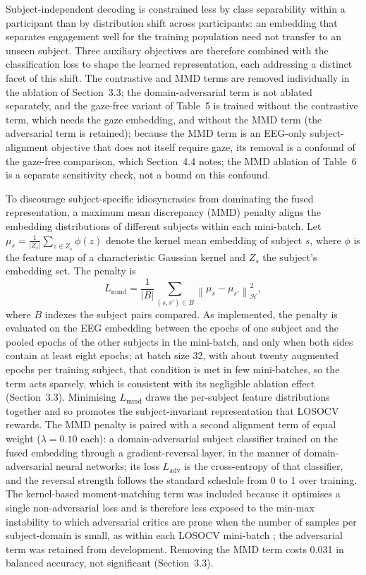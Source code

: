 \documentclass[pdflatex,sn-basic,Numbered]{sn-jnl}
\begin{document}
Subject-independent decoding is constrained less by class separability within a participant than by distribution shift across participants: an embedding that separates engagement well for the training population need not transfer to an unseen subject. Three auxiliary objectives are therefore combined with the classification loss to shape the learned representation, each addressing a distinct facet of this shift. The contrastive and MMD terms are removed individually in the ablation of Section~3.3; the domain-adversarial term is not ablated separately, and the gaze-free variant of Table~5 is trained without the contrastive term, which needs the gaze embedding, and without the MMD term (the adversarial term is retained); because the MMD term is an EEG-only subject-alignment objective that does not itself require gaze, its removal is a confound of the gaze-free comparison, which Section~4.4 notes; the MMD ablation of Table~6 is a separate sensitivity check, not a bound on this confound.

To discourage subject-specific idiosyncrasies from dominating the fused representation, a maximum mean discrepancy (MMD) penalty aligns the embedding distributions of different subjects within each mini-batch. Let $\mu_s = \frac{1}{|Z_s|}\sum_{z\in Z_s}\phi(z)$ denote the kernel mean embedding of subject $s$, where $\phi$ is the feature map of a characteristic Gaussian kernel and $Z_s$ the subject's embedding set. The penalty is
\begin{equation}
L_{\mathrm{mmd}} = \frac{1}{|B|} \sum_{(s,s')\in B} \left\| \mu_s - \mu_{s'} \right\|_{\mathcal H}^2, \label{eq21}
\end{equation}
where $B$ indexes the subject pairs compared. As implemented, the penalty is evaluated on the EEG embedding between the epochs of one subject and the pooled epochs of the other subjects in the mini-batch, and only when both sides contain at least eight epochs; at batch size 32, with about twenty augmented epochs per training subject, that condition is met in few mini-batches, so the term acts sparsely, which is consistent with its negligible ablation effect (Section~3.3). Minimising $L_{\mathrm{mmd}}$ draws the per-subject feature distributions together and so promotes the subject-invariant representation that LOSOCV rewards. The MMD penalty is paired with a second alignment term of equal weight ($\lambda=0.10$ each): a domain-adversarial subject classifier trained on the fused embedding through a gradient-reversal layer, in the manner of domain-adversarial neural networks; its loss $L_{\mathrm{adv}}$ is the cross-entropy of that classifier, and the reversal strength follows the standard schedule from 0 to 1 over training. The kernel-based moment-matching term was included because it optimises a single non-adversarial loss and is therefore less exposed to the min-max instability to which adversarial critics are prone when the number of samples per subject-domain is small, as within each LOSOCV mini-batch \cite{ref31,ref32}; the adversarial term was retained from development. Removing the MMD term costs 0.031 in balanced accuracy, not significant (Section~3.3).
\end{document}
